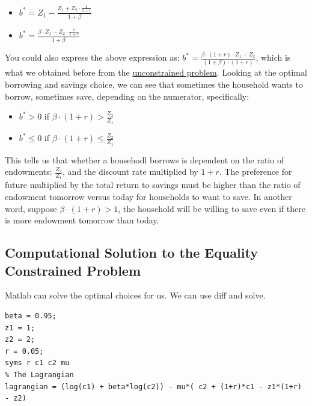 \documentclass[
]{book}
\begin{document}
\begin{itemize}
\item
  \(\displaystyle b^{\ast } =Z_1 -\frac{Z_1 +Z_2 \cdot \frac{1}{1+r}}{1+\beta }\)
\item
  \(\displaystyle b^{\ast } =\frac{\beta \cdot Z_1 -Z_2 \cdot \frac{1}{1+r}}{1+\beta }\)
\end{itemize}

You could also express the above expression as:
\(b^{\ast } =\frac{\beta \cdot (1+r)\cdot Z_1 -Z_2 }{\left(1+\beta \right)\cdot \left(1+r\right)}\),
which is what we obtained before from the \href{https://math4econ.github.io/derivative_application/K_save_households.html}{unconstrained
problem}.
Looking at the optimal borrowing and savings choice, we can see that
sometimes the household wants to borrow, sometimes save, depending on
the numerator, specifically:

\begin{itemize}
\item
  \(b^{\ast } >0\) if \(\beta \cdot (1+r)>\frac{Z_2 }{Z_1 }\)
\item
  \(b^{\ast } \le 0\) if \(\beta \cdot (1+r)\le \frac{Z_2 }{Z_1 }\)
\end{itemize}

This tells us that whether a househodl borrows is dependent on the ratio
of endowments: \(\frac{Z_2 }{Z_1 }\), and the discount rate multiplied by
\(1+r\). The preference for future multiplied by the total return to
savings must be higher than the ratio of endowment tomorrow versus today
for households to want to save. In another word, suppose
\(\beta \cdot (1+r)>1\), the household will be willing to save even if
there is more endowment tomorrow than today.

\hypertarget{computational-solution-to-the-equality-constrained-problem}{%
\subsection{Computational Solution to the Equality Constrained Problem}\label{computational-solution-to-the-equality-constrained-problem}}

Matlab can solve the optimal choices for us. We can use diff and solve.

\begin{verbatim}
beta = 0.95;
z1 = 1;
z2 = 2;
r = 0.05;
syms r c1 c2 mu
% The Lagrangian
lagrangian = (log(c1) + beta*log(c2)) - mu*( c2 + (1+r)*c1 - z1*(1+r) - z2)
\end{verbatim}
\end{document}
